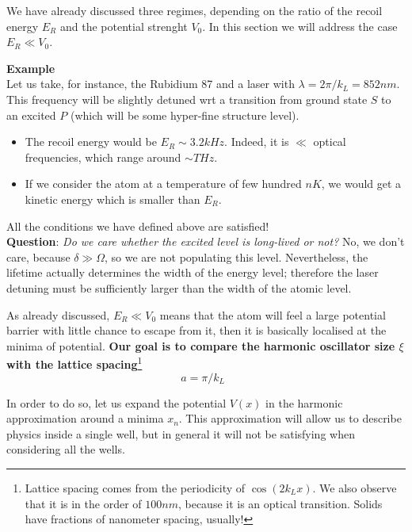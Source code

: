 We have already discussed three regimes, depending on the ratio of the recoil energy $E_R$ and the potential strenght $V_0$. In this section we will address the case $E_R \ll V_0$.


\begin{tcolorbox}
\textbf{Example}\\

Let us take, for instance, the Rubidium 87 and a laser with $\lambda = 2\pi/k_L = 852 nm$. This frequency will be slightly detuned wrt a transition from ground state $S$ to an excited $P$ (which will be some hyper-fine structure level). 

\begin{itemize}
    \item The recoil energy would be $E_R \sim 3.2 kHz$. Indeed, it is $\ll$ optical frequencies, which range around $\sim THz$.
    \item If we consider the atom at a temperature of few hundred $nK$, we would get a kinetic energy which is smaller than $E_R$.\\
\end{itemize}

All the conditions we have defined above are satisfied!\\

\noindent \textbf{Question}: \textit{Do we care whether the excited level is long-lived or not?} No, we don't care, because $\delta \gg \Omega$, so we are not populating this level. Nevertheless, the lifetime actually determines the width of the energy level; therefore the laser detuning must be sufficiently larger than the width of the atomic level.
\end{tcolorbox}


As already discussed, $E_R \ll V_0$ means that the atom will feel a large potential barrier with little chance to escape from it, then it is basically localised at the minima of potential. \textbf{Our goal is to compare the harmonic oscillator size $\xi$ with the lattice spacing}\footnote{
Lattice spacing comes from the periodicity of $\cos(2k_Lx)$. We also observe that it is in the order of $100 nm$, because it is an optical transition. Solids have fractions of nanometer spacing, usually!
}
$$a=\pi/k_L \;\;$$



In order to do so, let us expand the potential $V(x)$ in the harmonic approximation around a minima $x_n$. This approximation will allow us to describe physics inside a single well, but in general it will not be satisfying when considering all the wells.

